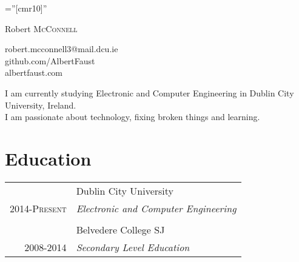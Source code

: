 \documentclass[a4paper,10pt]{article}
\begin{document}
\pagestyle{empty} 

\font\fb=''[cmr10]'' 

\par{\centering
		{\Huge Robert \textsc{McConnell}
	}\bigskip\par}

\par{\centering
    robert.mcconnell3@mail.dcu.ie \\
    github.com/AlbertFaust \\ 
    albertfaust.com \\
}\bigskip\par
\par{\centering
I am currently studying Electronic and Computer Engineering in Dublin City University, Ireland. \\
I am passionate about technology, fixing broken things and learning. \\
}\bigskip\par
\section{\textbf{Education}}

\begin{tabular}{r|p{11cm}}
 \emph & Dublin City University \\\textsc{2014-Present}&\emph{Electronic and Computer Engineering}\\\multicolumn{2}{c}{} \\
\emph & Belvedere College SJ \\\textsc{2008-2014}&\emph{Secondary Level Education}\\
\end{tabular}
\end{document}
